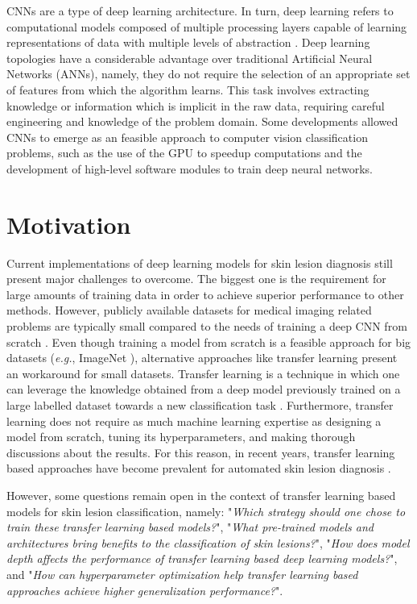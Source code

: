     \ac{CNN}s are a type of deep learning architecture. In turn, deep learning refers to computational models composed of multiple processing layers capable of learning representations of data with multiple levels of abstraction \cite{Goodfellow-et-al-2016}. Deep learning topologies have a considerable advantage over traditional Artificial Neural Networks (\acs{ANN}s), namely, they do not require the selection of an appropriate set of features from which the algorithm learns. This task involves extracting knowledge or information which is implicit in the raw data, requiring careful engineering and knowledge of the problem domain. Some developments allowed \ac{CNN}s to emerge as an feasible approach to computer vision classification problems, such as the use of the \ac{GPU} to speedup computations and the development of high-level software modules to train deep neural networks. \par
    
\section{Motivation}
    Current implementations of deep learning models for skin lesion diagnosis still present major challenges to overcome. The biggest one is the requirement for large amounts of training data in order to achieve superior performance to other methods. However, publicly available datasets for medical imaging related problems are typically small compared to the needs of training a deep \ac{CNN} from scratch \cite{Ching2018}. Even though training a model from scratch is a feasible approach for big datasets (\textit{e.g.}, ImageNet \cite{Deng2010}), alternative approaches like transfer learning present an workaround for small datasets. Transfer learning is a technique in which one can leverage the knowledge obtained from a deep model previously trained on a large labelled dataset towards a new classification task \cite{Yosinski2014}. Furthermore, transfer learning does not require as much machine learning expertise as designing a model from scratch, tuning its hyperparameters, and making thorough discussions about the results. For this reason, in recent years, transfer learning based approaches have become prevalent for automated skin lesion diagnosis \cite{Esteva2017}\cite{Haenssle2018}\cite{gessert2018}\cite{isic2019first}. 
    
    However, some questions remain open in the context of transfer learning based models for skin lesion classification, namely: "\textit{Which strategy should one chose to train these transfer learning based models?}", "\textit{What pre-trained models and architectures bring benefits to the classification of skin lesions?}", "\textit{How does model depth affects the performance of transfer learning based deep learning models?}", and "\textit{How can hyperparameter optimization help transfer learning based approaches achieve higher generalization performance?}". \par 
    
